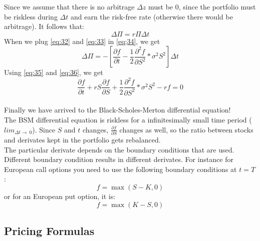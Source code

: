 \documentclass{article}
\DeclareMathOperator{\max}{max}
\begin{document}
Since we assume that there is no arbitrage $\Delta z$ must be 0, since the portfolio must be riskless during $\Delta t$ and earn the risk-free rate (otherwise there would be arbitrage). It follows that:
\begin{equation}\label{eq:35}
    \Delta \Pi = r \Pi \Delta t
\end{equation}
When we plug \ref{eq:32} and \ref{eq:33} in \ref{eq;34}, we get
\begin{equation}\label{eq:36}
    \Delta \Pi = - \left[\frac{\partial f }{\partial t} - \frac{1}{2}\frac{\partial^{2} f }{\partial S^{2}} * \sigma^{2} S^{2}\right] \Delta t
\end{equation}
Using \ref{eq:35} and \ref{eq:36}, we get 
\begin{equation}
    \frac{\partial f }{\partial t} + r S \frac{\partial f}{\partial S} +\frac{1}{2}\frac{\partial^{2} f }{\partial S^{2}} * \sigma^{2} S^{2} - rf = 0
\end{equation}\\
Finally we have arrived to the Black-Scholes-Merton differential equation!\\[3ex]
The BSM differential equation is riskless for a infinitesimally small time period ($lim_{\Delta t\to\ 0}$). Since $S$ and $t$ changes, $\frac{\partial f}{\partial S}$ changes as well, so the ratio between stocks and derivates kept in the portfolio gets rebalanced. \\[2ex]
The particular derivate depends on the boundary conditions that are used. Different boundary condition results in different derivates. For instance for European call options you need to use the following boundary conditions at $t=T$:
\begin{equation*}
    f = \max (S - K, 0)
\end{equation*}
or for an European put option, it is:
\begin{equation*}
    f = \max (K - S, 0)
\end{equation*}
\subsection{Pricing Formulas}
\end{document}
